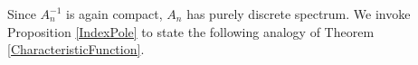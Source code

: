 \documentclass[11pt, a4paper,reqno]{amsart}
\theoremstyle{plain}
\newtheorem{theorem}{{Theorem}}[section]
\theoremstyle{definition}
\theoremstyle{remark}
\newcommand{\inner}[2]{\left\langle{#1}, {#2}\right\rangle}
\newcommand{\norm}[1]{\left|\left|#1\right|\right|}
\newcommand{\1}{\mathds 1}
\begin{document}



Since $A_n^{-1}$ is again compact, $A_n$ has purely discrete spectrum. We invoke Proposition \ref{IndexPole} to state the following analogy of Theorem \ref{CharacteristicFunction}. 
\end{document}
